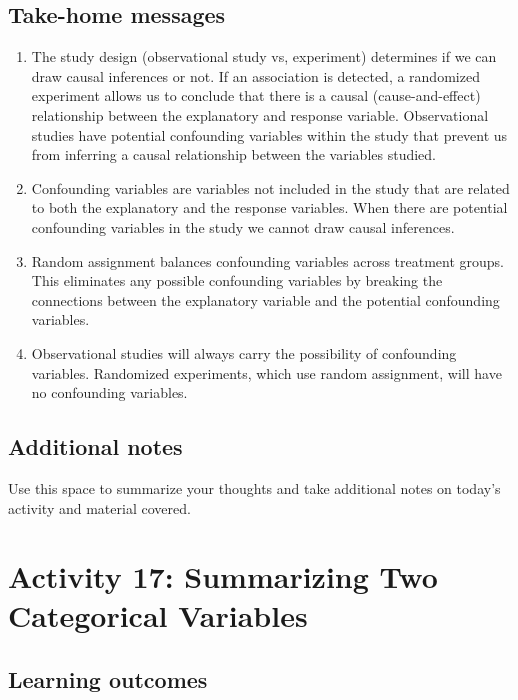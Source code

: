 \documentclass[
]{report}
\begin{document}
\subsection{Take-home messages}\label{take-home-messages-5}

\begin{enumerate}
\def\labelenumi{\arabic{enumi}.}
\item
  The study design (observational study vs, experiment) determines if we can draw causal inferences or not. If an association is detected, a randomized experiment allows us to conclude that there is a causal (cause-and-effect) relationship between the explanatory and response variable. Observational studies have potential confounding variables within the study that prevent us from inferring a causal relationship between the variables studied.
\item
  Confounding variables are variables not included in the study that are related to both the explanatory and the response variables. When there are potential confounding variables in the study we cannot draw causal inferences.
\item
  Random assignment balances confounding variables across treatment groups. This eliminates any possible confounding variables by breaking the connections between the explanatory variable and the potential confounding variables.
\item
  Observational studies will always carry the possibility of confounding variables. Randomized experiments, which use random assignment, will have no confounding variables.
\end{enumerate}

\subsection{Additional notes}\label{additional-notes-5}

Use this space to summarize your thoughts and take additional notes on today's activity and material covered.

\newpage

\section{Activity 17: Summarizing Two Categorical Variables}\label{activity-17-summarizing-two-categorical-variables}


\subsection{Learning outcomes}\label{learning-outcomes-7}
\end{document}
